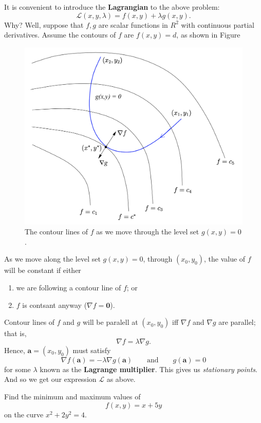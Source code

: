 
It is convenient to introduce the \textbf{Lagrangian} to the above problem:
\[ \mathcal L(x, y, \lambda) = f(x, y) + \lambda g(x, y). \]
Why? Well, suppose that $f, g$ are scalar functions in $R^2$ with 
continuous partial derivatives.
Assume the contours of $f$ are $f(x, y) = d$, as shown in Figure %
\begin{figure}
    \centering
    \includegraphics[width=0.7\linewidth]{images/lagrangian.png}
    \caption{The contour lines of $f$ as we move through the level set $g(x, y) = 0$.}
    \label{fig:lagrangian}
\end{figure}
As we move along the level set $g(x, y) = 0$, 
through $(x_0, y_0)$, 
the value of $f$ will be constant if either
\begin{enumerate}
    \item we are following a contour line of $f$; or
    \item $f$ is contsant anyway ($\nabla f = \bm 0$).
\end{enumerate}
Contour lines of $f$ and $g$ will be paralell at $(x_0, y_0)$ iff 
$\nabla f$ and $\nabla g$ are parallel; that is,
\[ \nabla f = \lambda \nabla g. \]
Hence, $\bm a = (x_0, y_0)$ must satisfy
\[ \nabla f(\bm a) = -\lambda\nabla g(\bm a) \qquad \text{and} \qquad
g(\bm a) = 0 \]
for some $\lambda$ known as the \textbf{Lagrange multiplier}.
This gives us \emph{stationary points}.
And so we get our expression $\mathcal L$ as above.

\begin{example}
    Find the minimum and maximum values of
    \[ f(x, y) = x + 5y \]
    on the curve $x^2 + 2y^2 = 4$.
\end{example}

